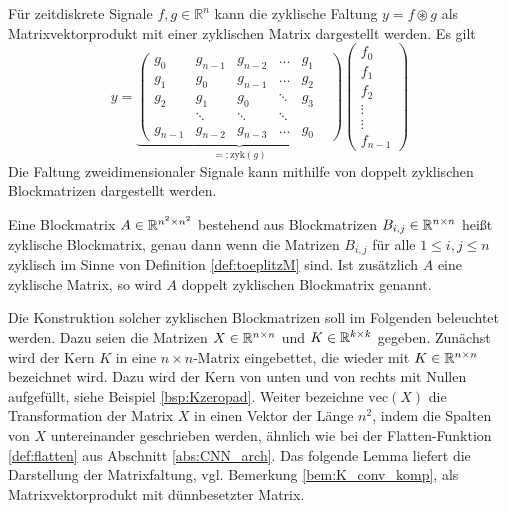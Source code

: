 Für zeitdiskrete Signale $f,g \in \mathbb{R}^{n}$ kann die zyklische Faltung $y=f \circledast g$ als Matrixvektorprodukt mit einer zyklischen Matrix dargestellt werden. Es gilt 
\begin{equation*}
    y=\underbrace{\begin{pmatrix}
        g_0 & g_{n-1} &g_{n-2} &\ldots &g_1 \\ 
        g_1 & g_0 &g_{n-1} &\ldots &g_2 \\
        g_2 &g_1 &g_0 &\ddots &g_3\\
        &\ddots &\ddots &\ddots & & \\
        g_{n-1} &g_{n-2} &g_{n-3} &\ldots &g_0
    \end{pmatrix}}_{=:\mathrm{zyk}(g)}
    \begin{pmatrix}
        f_0 \\
        f_1 \\
        f_2 \\
        \vdots \\
        \vdots \\
        f_{n-1}
    \end{pmatrix}
\end{equation*}
Die Faltung zweidimensionaler Signale kann mithilfe von doppelt zyklischen Blockmatrizen dargestellt werden.
\begin{defi}
    \label{def:double_circ}
    Eine Blockmatrix $A \in \mathbb{R}^{n^2 \times n^2}$ bestehend aus Blockmatrizen $B_{i,j} \in \mathbb{R}^{n \times n}$ heißt zyklische Blockmatrix, genau dann wenn die Matrizen $B_{i,j}$ für alle $ 1 \leq i, j \leq n$ zyklisch im Sinne von Definition \ref{def:toeplitzM} sind. Ist zusätzlich $A$ eine zyklische Matrix, so wird $A$ doppelt zyklischen Blockmatrix genannt.
\end{defi}

Die Konstruktion solcher zyklischen Blockmatrizen soll im Folgenden beleuchtet werden. Dazu seien die Matrizen $X \in \mathbb{R}^{n \times n}$ und $K \in \mathbb{R}^{k \times k}$ gegeben. Zunächst wird der Kern $K$ in eine $n \times n$-Matrix eingebettet, die wieder mit $K \in \mathbb{R}^{n \times n}$ bezeichnet wird. Dazu wird der Kern von unten und von rechts mit Nullen aufgefüllt, siehe Beispiel \ref{bsp:Kzeropad}.
Weiter bezeichne $\mathrm{vec}(X)$ die Transformation der Matrix $X$ in einen Vektor der Länge $n^2$, indem die Spalten von $X$ untereinander geschrieben werden, ähnlich wie bei der Flatten-Funktion \ref{def:flatten} aus Abschnitt \ref{abs:CNN_arch}. Das folgende Lemma liefert die Darstellung der Matrixfaltung, vgl. Bemerkung \ref{bem:K_conv_komp}, als Matrixvektorprodukt mit dünnbesetzter Matrix.


